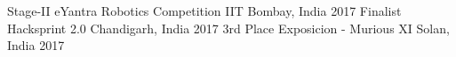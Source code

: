 
\begin{cvhonors}
\cvhonor
    {Stage-II}
    {eYantra Robotics Competition}
    {IIT Bombay, India}
    {2017}
  \cvhonor
    {Finalist}
    { Hacksprint 2.0 }
    {Chandigarh, India}
    {2017}
\cvhonor
    {3rd Place}
    {Exposicion - Murious XI}
    {Solan, India}
    {2017}
    
\end{cvhonors}
